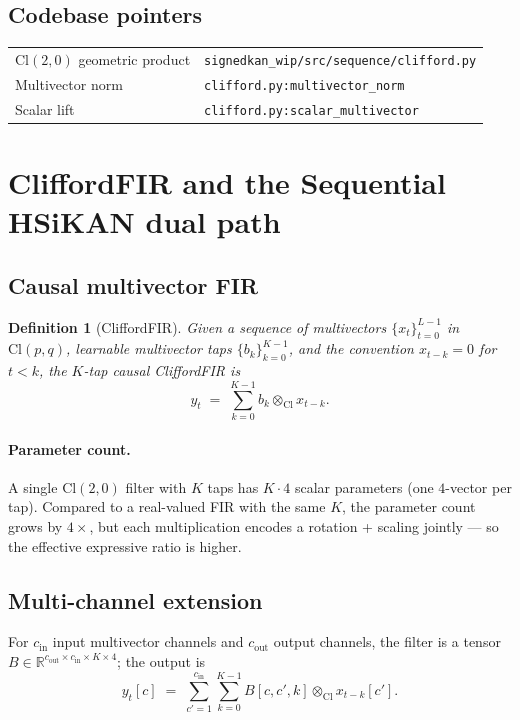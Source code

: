 \documentclass[11pt,a4paper]{article}
\newtheorem{definition}[theorem]{Definition}
\theoremstyle{remark}
\newcommand{\R}{\mathbb{R}}
\newcommand{\gp}{\otimes_{\mathrm{Cl}}}
\newcommand{\Cl}[2]{\mathrm{Cl}(#1, #2)}
\begin{document}
\subsection{Codebase pointers}

\begin{tabular}{ll}
$\Cl{2}{0}$ geometric product & \texttt{signedkan\_wip/src/sequence/clifford.py} \\
Multivector norm & \texttt{clifford.py:multivector\_norm} \\
Scalar lift & \texttt{clifford.py:scalar\_multivector} \\
\end{tabular}

\section{CliffordFIR and the Sequential HSiKAN dual path}

\subsection{Causal multivector FIR}

\begin{definition}[CliffordFIR]
Given a sequence of multivectors $\{x_t\}_{t = 0}^{L - 1}$ in
$\Cl{p}{q}$, learnable multivector taps $\{b_k\}_{k = 0}^{K-1}$,
and the convention $x_{t-k} = 0$ for $t < k$, the
\emph{$K$-tap causal CliffordFIR} is
\[
  y_t \;=\; \sum_{k = 0}^{K - 1} b_k \gp x_{t-k}.
\]
\end{definition}

\paragraph{Parameter count.} A single $\Cl{2}{0}$ filter with
$K$ taps has $K \cdot 4$ scalar parameters (one $4$-vector per
tap). Compared to a real-valued FIR with the same $K$, the
parameter count grows by $4\times$, but each multiplication
encodes a rotation + scaling jointly --- so the effective
expressive ratio is higher.

\subsection{Multi-channel extension}

For $c_{\text{in}}$ input multivector channels and $c_{\text{out}}$
output channels, the filter is a tensor
$B \in \R^{c_{\text{out}} \times c_{\text{in}} \times K \times 4}$;
the output is
\[
  y_t[c] \;=\; \sum_{c' = 1}^{c_{\text{in}}} \sum_{k = 0}^{K - 1}
                B[c, c', k] \gp x_{t-k}[c'].
\]
\end{document}
